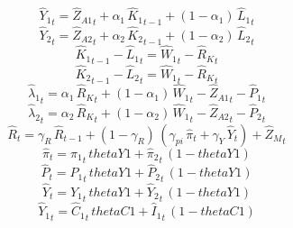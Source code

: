 \begin{dmath}
{{\hat{Y}_{1}}}_{t}={{\hat{Z}_{A1}}}_{t}+{{\alpha_{1}}}\, {{\hat{K}_{1}}}_{t-1}+\left(1-{{\alpha_{1}}}\right)\, {{\hat{L}_{1}}}_{t}
\end{dmath}
\begin{dmath}
{{\hat{Y}_{2}}}_{t}={{\hat{Z}_{A2}}}_{t}+{{\alpha_{2}}}\, {{\hat{K}_{2}}}_{t-1}+\left(1-{{\alpha_{2}}}\right)\, {{\hat{L}_{2}}}_{t}
\end{dmath}
\begin{dmath}
{{\hat{K}_{1}}}_{t-1}-{{\hat{L}_{1}}}_{t}={{\hat{W}_{1}}}_{t}-{{\hat{R}_{K}}}_{t}
\end{dmath}
\begin{dmath}
{{\hat{K}_{2}}}_{t-1}-{{\hat{L}_{2}}}_{t}={{\hat{W}_{1}}}_{t}-{{\hat{R}_{K}}}_{t}
\end{dmath}
\begin{dmath}
{{\hat{\lambda}_{1}}}_{t}={{\alpha_{1}}}\, {{\hat{R}_{K}}}_{t}+\left(1-{{\alpha_{1}}}\right)\, {{\hat{W}_{1}}}_{t}-{{\hat{Z}_{A1}}}_{t}-{{\hat{P}_{1}}}_{t}
\end{dmath}
\begin{dmath}
{{\hat{\lambda}_{2}}}_{t}={{\alpha_{2}}}\, {{\hat{R}_{K}}}_{t}+\left(1-{{\alpha_{2}}}\right)\, {{\hat{W}_{1}}}_{t}-{{\hat{Z}_{A2}}}_{t}-{{\hat{P}_{2}}}_{t}
\end{dmath}
\begin{dmath}
{{\hat{R}}}_{t}={{\gamma_{R}}}\, {{\hat{R}}}_{t-1}+\left(1-{{\gamma_{R}}}\right)\, \left({{\gamma_{pi}}}\, {{\hat{\pi}}}_{t}+{{\gamma_{Y}}}\, {{\hat{Y}}}_{t}\right)+{{\hat{Z}_M}}_{t}
\end{dmath}
\begin{dmath}
{{\hat{\pi}}}_{t}={{\hat{\pi}_{1}}}_{t}\, {thetaY1}+{{\hat{\pi}_{2}}}_{t}\, \left(1-{thetaY1}\right)
\end{dmath}
\begin{dmath}
{{\hat{P}}}_{t}={{\hat{P}_{1}}}_{t}\, {thetaY1}+{{\hat{P}_{2}}}_{t}\, \left(1-{thetaY1}\right)
\end{dmath}
\begin{dmath}
{{\hat{Y}}}_{t}={{\hat{Y}_{1}}}_{t}\, {thetaY1}+{{\hat{Y}_{2}}}_{t}\, \left(1-{thetaY1}\right)
\end{dmath}
\begin{dmath}
{{\hat{Y}_{1}}}_{t}={{\hat{C}_{1}}}_{t}\, {thetaC1}+{{\hat{I}_{1}}}_{t}\, \left(1-{thetaC1}\right)
\end{dmath}
